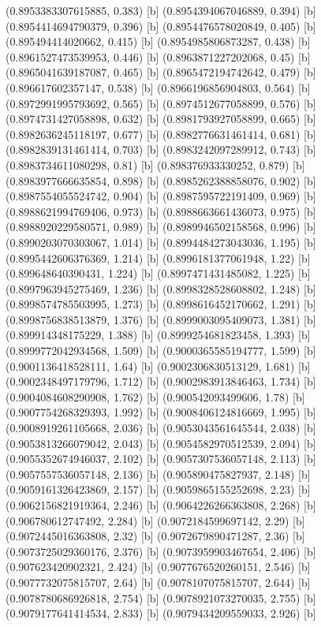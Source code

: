 {{{(0.8953383307615885, 0.383) [b] 
(0.8954394067046889, 0.394) [b] 
(0.8954414694790379, 0.396) [b] 
(0.8954476578020849, 0.405) [b] 
(0.895494414020662, 0.415) [b] 
(0.8954985806873287, 0.438) [b] 
(0.8961527473539953, 0.446) [b] 
(0.8963871227202068, 0.45) [b] 
(0.8965041639187087, 0.465) [b] 
(0.8965472194742642, 0.479) [b] 
(0.896617602357147, 0.538) [b] 
(0.8966196856904803, 0.564) [b] 
(0.8972991995793692, 0.565) [b] 
(0.8974512677058899, 0.576) [b] 
(0.8974731427058898, 0.632) [b] 
(0.8981793927058899, 0.665) [b] 
(0.8982636245118197, 0.677) [b] 
(0.8982776631461414, 0.681) [b] 
(0.8982839131461414, 0.703) [b] 
(0.8983242097289912, 0.743) [b] 
(0.8983734611080298, 0.81) [b] 
(0.898376933330252, 0.879) [b] 
(0.8983977666635854, 0.898) [b] 
(0.8985262388858076, 0.902) [b] 
(0.8987554055524742, 0.904) [b] 
(0.8987595722191409, 0.969) [b] 
(0.8988621994769406, 0.973) [b] 
(0.8988663661436073, 0.975) [b] 
(0.8988920229580571, 0.989) [b] 
(0.8989946502158568, 0.996) [b] 
(0.8990203070303067, 1.014) [b] 
(0.8994484273043036, 1.195) [b] 
(0.8995442606376369, 1.214) [b] 
(0.8996181377061948, 1.22) [b] 
(0.899648640390431, 1.224) [b] 
(0.8997471431485082, 1.225) [b] 
(0.8997963945275469, 1.236) [b] 
(0.8998328528608802, 1.248) [b] 
(0.8998574785503995, 1.273) [b] 
(0.8998616452170662, 1.291) [b] 
(0.8998756838513879, 1.376) [b] 
(0.8999003095409073, 1.381) [b] 
(0.899914348175229, 1.388) [b] 
(0.8999254681823458, 1.393) [b] 
(0.8999772042934568, 1.509) [b] 
(0.9000365585194777, 1.599) [b] 
(0.9001136418528111, 1.64) [b] 
(0.9002306830513129, 1.681) [b] 
(0.9002348497179796, 1.712) [b] 
(0.9002983913846463, 1.734) [b] 
(0.9004084608290908, 1.762) [b] 
(0.900542093499606, 1.78) [b] 
(0.9007754268329393, 1.992) [b] 
(0.9008406124816669, 1.995) [b] 
(0.9008919261105668, 2.036) [b] 
(0.9053043561645544, 2.038) [b] 
(0.9053813266079042, 2.043) [b] 
(0.9054582970512539, 2.094) [b] 
(0.9055352674946037, 2.102) [b] 
(0.9057307536057148, 2.113) [b] 
(0.9057557536057148, 2.136) [b] 
(0.905890475827937, 2.148) [b] 
(0.9059161326423869, 2.157) [b] 
(0.9059865155252698, 2.23) [b] 
(0.9062156821919364, 2.246) [b] 
(0.9064226266363808, 2.268) [b] 
(0.906780612747492, 2.284) [b] 
(0.9072184599697142, 2.29) [b] 
(0.9072445016363808, 2.32) [b] 
(0.9072679890471287, 2.36) [b] 
(0.9073725029360176, 2.376) [b] 
(0.9073959903467654, 2.406) [b] 
(0.907623420902321, 2.424) [b] 
(0.9077676520260151, 2.546) [b] 
(0.9077732075815707, 2.64) [b] 
(0.9078107075815707, 2.644) [b] 
(0.9078780686926818, 2.754) [b] 
(0.9078921073270035, 2.755) [b] 
(0.9079177641414534, 2.833) [b] 
(0.9079434209559033, 2.926) [b] 
}}}
